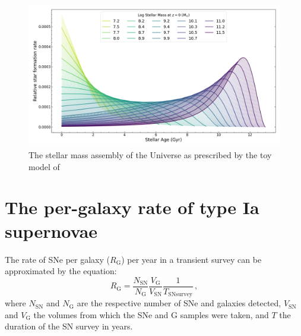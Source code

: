 \documentclass[fleqn,usenatbib]{mnras}
\begin{document}

\begin{figure}
    \centering
    \includegraphics[width=\textwidth]{figs/SFHs_colour.png}
    \caption{The stellar mass assembly of the Universe as prescribed by the toy model of \citet{Childress2014}}
    \label{fig:SFHs}
\end{figure}


\section{The per-galaxy rate of type Ia supernovae}
\label{sec:rates}
The rate of SNe per galaxy ($R_{\mathrm{G}}$) per year in a transient survey can be approximated by the equation:
\begin{equation}
    R_{\mathrm{G}} = \frac{N_{\mathrm{SN}}}{N_{\mathrm{G}}} \frac{V_{\mathrm{G}}}{V_{\mathrm{SN}}}\frac{1}{T_{\mathrm{SN  survey}}}\,,
\label{eq:rate1}
\end{equation}
where $N_{\mathrm{SN}}$ and $N_{\mathrm{G}}$ are the respective number of SNe and galaxies detected, $V_{\mathrm{SN}}$ and $V_{\mathrm{G}}$ the volumes from which the SNe and G samples were taken, and $T$ the duration of the SN survey in years. 
\end{document}
